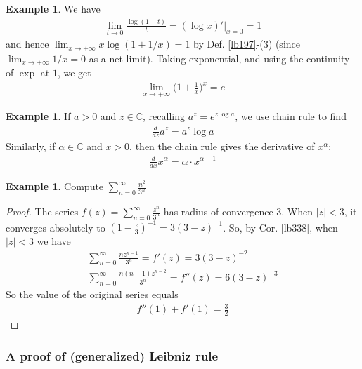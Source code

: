 \documentclass[12pt,b5paper,notitlepage]{article}
\theoremstyle{definition}
\newtheorem{eg}[df]{Example}
\theoremstyle{plain}
\newcommand{\Cbb}{\mathbb C}
\newcommand{\dps}{\displaystyle}
\numberwithin{equation}{section}
\begin{document}
\begin{eg}
We have 
\begin{align*}
\lim_{t\rightarrow 0}\frac{\log(1+t)}t=(\log x)'|_{x=0}=1
\end{align*}
and hence $\lim_{x\rightarrow +\infty}x\log(1+1/x)=1$ by Def. \ref{lb197}-(3) (since $\lim_{x\rightarrow+\infty}1/x=0$ as a net limit). Taking exponential, and using the continuity of $\exp$ at $1$, we get 
\begin{align*}
\lim_{x\rightarrow+\infty}\Big(1+\frac 1x\Big)^x=e
\end{align*} 
\end{eg}




\begin{eg}
If $a>0$ and $z\in\Cbb$, recalling $a^z=e^{z\log a}$, we use chain rule to find
\begin{align*}
\frac d{dz}a^z=a^z\log a
\end{align*}
Similarly, if $\alpha\in\Cbb$ and $x>0$, then the chain rule gives the derivative of $x^\alpha$:
\begin{align*}
\frac d{dx}x^\alpha=\alpha\cdot x^{\alpha-1}
\end{align*}
\end{eg}



\begin{eg}
Compute $\dps\sum_{n=0}^\infty \frac {n^2}{3^n}$
\end{eg}


\begin{proof}
The series $\dps f(z)=\sum_{n=0}^\infty \frac{z^n}{3^n}$ has radius of convergence $3$. When $|z|<3$, it converges absolutely to $(1-\frac z3)^{-1}=3(3-z)^{-1}$. So, by Cor. \ref{lb338}, when $|z|<3$ we have
\begin{gather*}
    \sum_{n=0}^\infty \frac{nz^{n-1}}{3^n}=f'(z)=3(3-z)^{-2}\\
    \sum_{n=0}^\infty \frac{n(n-1)z^{n-2}}{3^n}=f''(z)=6(3-z)^{-3}
\end{gather*}
So the value of the original series equals
\begin{align*}
f''(1)+f'(1)=\frac 32
\end{align*}
\end{proof}


\subsubsection{A proof of (generalized) Leibniz rule}
\end{document}
